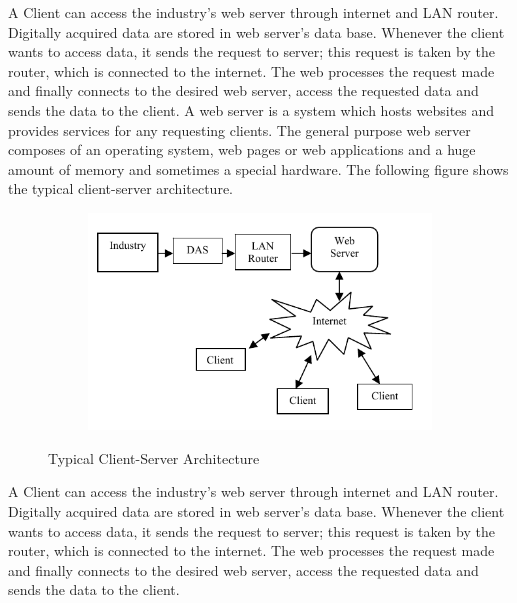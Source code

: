 \documentclass{FR16}
\begin{document}
A Client can
access the industry’s web server through internet and LAN router. Digitally acquired data are stored in web server’s
data base. Whenever the client wants to access data, it sends the request to server; this request is taken by the router,
which is connected to the internet. The web processes the request made and finally connects to the desired web
server, access the requested data and sends the data to the client.
A web server is a system which hosts websites and provides services for any requesting clients. The general purpose web server composes of an operating system, web pages or web applications and a huge amount of memory and sometimes a special hardware. The following figure shows the typical client-server architecture. 

  \begin{figure}[H]
 
    \begin{subfigure}{\textwidth}
    \includegraphics[scale=0.8]{Client_Server_arch.png} 
    \label{fig:DJp1}
    \end{subfigure}
 
 \caption{Typical Client-Server Architecture}
\label{fig6}
\end{figure}


A Client can access the industry’s web server through internet and LAN router. Digitally acquired data are stored in web server’s
data base. Whenever the client wants to access data, it sends the request to server; this request is taken by the router,
which is connected to the internet. The web processes the request made and finally connects to the desired web
server, access the requested data and sends the data to the client.
\end{document}

